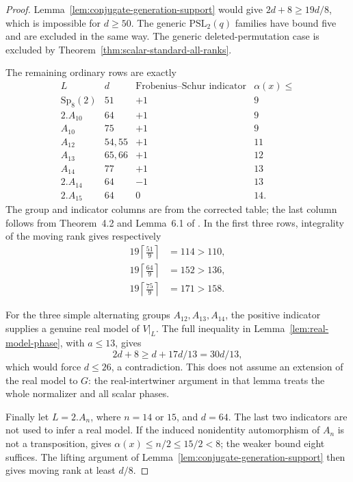 \documentclass[11pt]{article}
\theoremstyle{definition}
\theoremstyle{remark}
\begin{document}
\begin{proof}
Lemma~\ref{lem:conjugate-generation-support} would give
$2d+8\geq19d/8$, which is impossible for $d\geq50$.
The generic $\mathrm{PSL}_2(q)$ families have bound five and
are excluded in the same way. The generic deleted-permutation
case is excluded by Theorem~\ref{thm:scalar-standard-all-ranks}.

The remaining ordinary rows are exactly
\[
\begin{array}{c|c|c|c}
 L&d&\text{Frobenius--Schur indicator}&\alpha(x)\leq\\\hline
 \mathrm{Sp}_8(2)&51&+1&9\\
 2.A_{10}&64&+1&9\\
 A_{10}&75&+1&9\\
 A_{12}&54,55&+1&11\\
 A_{13}&65,66&+1&12\\
 A_{14}&77&+1&13\\
 2.A_{14}&64&-1&13\\
 2.A_{15}&64&0&14.
\end{array}
\]
The group and indicator columns are from the corrected table;
the last column follows from Theorem~4.2 and Lemma~6.1 of
\cite{GS}. In the first three rows, integrality of the moving
rank gives respectively
\[
 \begin{aligned}
 19\left\lceil\frac{51}{9}\right\rceil&=114>110,\\
 19\left\lceil\frac{64}{9}\right\rceil&=152>136,\\
 19\left\lceil\frac{75}{9}\right\rceil&=171>158.
 \end{aligned}
\]

For the three simple alternating groups $A_{12},A_{13},A_{14}$,
the positive indicator supplies a genuine real model of $V|_L$.
The full inequality in Lemma~\ref{lem:real-model-phase}, with
$a\leq13$, gives
\[
 2d+8\geq d+17d/13=30d/13,
\]
which would force $d\leq26$, a contradiction.
This does not assume an extension of the real model to $G$:
the real-intertwiner argument in that lemma treats the whole
normalizer and all scalar phases.

Finally let $L=2.A_n$, where $n=14$ or $15$, and $d=64$.
The last two indicators are not used to infer a real model.
If the induced nonidentity automorphism of $A_n$ is not a
transposition, \cite[Lemma~6.1]{GS} gives
$\alpha(x)\leq n/2\leq15/2<8$; the weaker bound eight suffices.
The lifting argument of Lemma~\ref{lem:conjugate-generation-support}
then gives moving rank at least $d/8$.


\end{proof}
\end{document}
